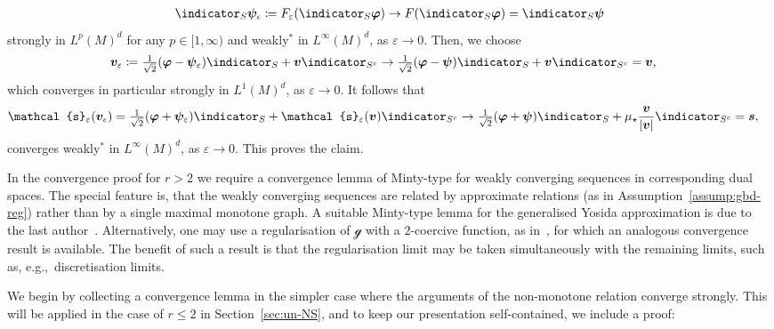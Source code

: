 \documentclass[reqno,a4paper]{amsart}
\def\abs#1{\left| #1 \right|}
\def\vec#1{\boldsymbol{#1}}
\def\bs{\vec{s}}
\def\bv{\vec{v}}
\def\bpsi{\vec{\psi}}
\def\bphi{\vec{\varphi}}
\def\gbd{\vec{\mathcal{g}}}
\def\Srel{\vec{\mathcal{s}}}
\def\Seps{\Srel_{\varepsilon}}
\begin{document}
\begin{example}
\begin{align*}
			\indicator_{S} \bpsi_\epsilon \coloneqq F_{\varepsilon}( \indicator_{S}\bphi ) \to F(\indicator_{S}\bphi ) = \indicator_{S}  \bpsi 
		\end{align*}
		strongly in $L^p(M)^d$ for any $p \in [1,\infty)$ and weakly$^*$ in $L^\infty(M)^d$, as $\varepsilon \to 0$. 
		Then, we choose 
		\begin{align*}
			\bv_{\varepsilon} &\coloneqq  \tfrac{1}{\sqrt{2}} (\bphi - \bpsi_{\varepsilon})    \indicator_{S} + \bv \indicator_{S^c} \to  
			\tfrac{1}{\sqrt{2}} (\bphi - \bpsi)    \indicator_{S} + \bv \indicator_{S^c} 
			= \bv, 
		\end{align*}
		which converges in particular strongly in $L^1(M)^d$, as $\varepsilon \to 0$. 
		It follows that 
		\begin{align*}
			\Seps(\bv_{\epsilon}) &= 
			\tfrac{1}{\sqrt{2}} (\bphi + \bpsi_{\varepsilon}) \indicator_{S} + \Seps(\bv) \indicator_{S^c}
			\to \tfrac{1}{\sqrt{2}} (\bphi + \bpsi) \indicator_{S} 
			+ \mu_{\star} \frac{\bv}{\abs{\bv}}\indicator_{S^c}  = \bs, 
		\end{align*}	
		converges weakly$^*$ in $L^\infty(M)^d$, as $\varepsilon \to 0$. 
		This proves the claim. 
	\end{example}
	
	In the convergence proof for $r >2$ we require a convergence lemma of Minty-type for weakly converging {sequences} in corresponding dual spaces. 
	The special feature is, that the weakly converging sequences are related by approximate relations (as in Assumption~\ref{assump:gbd-reg}) rather than by a single maximal monotone graph. 
	A suitable Minty-type lemma for the generalised Yosida approximation is due to the last author~\cite[Lem.~3.31]{T.2018}.  
	Alternatively, one may use a regularisation of $\gbd$ with a $2$-coercive function, as in~\cite[Lem.~4.1]{Bulicek2021}, for which an analogous convergence result is available. 
	The benefit of such a result is that the regularisation limit may be taken simultaneously with the remaining limits, such as, e.g.,~discretisation limits. 
	
	We begin by collecting a convergence lemma in the simpler case where the arguments of the non-monotone relation converge strongly. 
	This will be applied in the case of $r\leq 2$ in  Section~\ref{sec:un-NS}, and to keep our presentation self-contained, we include a proof: 
	
\end{document}
